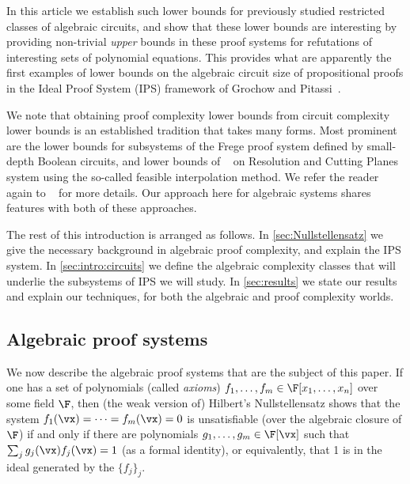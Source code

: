 \documentclass[11pt]{article}
\numberwithin{equation}{section}
\theoremstyle{definition}
\theoremstyle{plain}
\begin{document}
In this article
we establish such lower bounds for previously studied restricted classes of algebraic circuits, and show that these lower bounds are interesting by providing non-trivial \emph{upper} bounds in these proof systems for refutations of interesting sets of polynomial equations.  This provides what are apparently the first examples of lower bounds on the algebraic circuit size of propositional proofs in the Ideal Proof System (IPS) framework of Grochow and Pitassi~\cite{DBLP:journals/jacm/GrochowP18}.

We note that obtaining proof complexity lower bounds from circuit complexity lower bounds is an established tradition that takes many forms. Most prominent are the lower bounds for subsystems of the Frege proof system defined by small-depth Boolean circuits, and lower bounds of \Pudlak~\cite{Pudlak97} on Resolution and Cutting Planes system using the so-called feasible interpolation method.  We refer the reader again to \Krajicek~\cite{Krajicek95} for more details. Our approach here for algebraic systems shares features with both of these approaches.

The rest of this introduction is arranged as follows. In \autoref{sec:Nullstellensatz} we give the necessary background in algebraic proof complexity, and explain the IPS system. In \autoref{sec:intro:circuits} we define the algebraic complexity classes that will underlie the subsystems of IPS we will study. In \autoref{sec:results} we state our results and explain our techniques, for both the algebraic and proof complexity worlds.

\subsection{Algebraic proof systems}\label{sec:Nullstellensatz}

We now describe the algebraic proof systems that are the subject of this paper.  If one has a set of polynomials (called \emph{axioms}) $f_1,\ldots,f_m\in\F[x_1,\ldots,x_n]$ over some field $\F$, then (the weak version of) Hilbert's Nullstellensatz shows that the system $f_1(\vx)=\cdots=f_m(\vx)=0$ is unsatisfiable (over the algebraic closure of $\F$) if and only if there are polynomials $g_1,\ldots,g_m\in\F[\vx]$ such that $\sum_j g_j(\vx)f_j(\vx)=1$ (as a formal identity), or equivalently, that 1 is in the ideal generated by the $\{f_j\}_j$.
\end{document}
